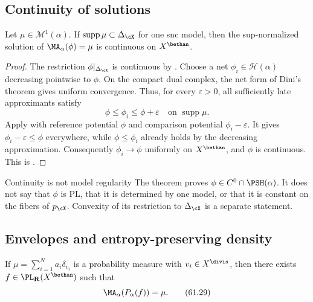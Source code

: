\subsection{Continuity of solutions}
\label{subsec:mpwn-continuous-solutions}

\begin{theorem}\label{thm:mpwn-dual-complex-regularity}
Let $\mu\in\mathcal M^1(\alpha)$.  If
$\operatorname{supp}\mu\subset\Delta_{\cX}$ for one snc model, then the
sup-normalized solution of
$\MA_\alpha(\phi)=\mu$ is continuous on $X^{\bethan}$.
\end{theorem}

\begin{proof}
The restriction $\phi|_{\Delta_{\cX}}$ is continuous by
.  Choose a net
$\phi_i\in\mathcal H(\alpha)$ decreasing pointwise to $\phi$.
On the compact dual complex, the net form of Dini's theorem gives
uniform convergence.  Thus, for every $\varepsilon>0$, all sufficiently
late approximants satisfy
\[
              \phi\leq\phi_i\leq\phi+\varepsilon
       \quad\text{on }\operatorname{supp}\mu.
\]
Apply  with reference potential $\phi$
and comparison potential $\phi_i-\varepsilon$.
It gives $\phi_i-\varepsilon\leq\phi$ everywhere, while
$\phi\leq\phi_i$ already holds by the decreasing approximation.
Consequently $\phi_i\to\phi$ uniformly on $X^{\bethan}$, and
$\phi$ is continuous.  This is \cite[Theorem~8.2.1]{MPWN25}.
\end{proof}

\noindent\begin{minipage}{\linewidth}
\begin{warning}{Continuity is not model regularity}
\label{warn:mpwn-continuous-not-model}
The theorem proves $\phi\in C^0\cap\PSH(\alpha)$.  It does not say that
$\phi$ is PL, that it is determined by one model, or that it is constant
on the fibers of $p_{\cX}$.  Convexity of its restriction to
$\Delta_{\cX}$ is a separate statement.
\end{warning}
\end{minipage}\par

\subsection{Envelopes and entropy-preserving density}
\label{subsec:mpwn-envelope-density}

\begin{corollary}\label{cor:mpwn-divisorial-envelope}
If $\mu=\sum_{i=1}^Na_i\delta_{v_i}$ is a probability measure with
$v_i\in X^{\divis}$, then there exists
$f\in\PL_{\mathbf R}(X^{\bethan})$ such
that
\[
                   \MA_\alpha(P_\alpha(f))=\mu.
\tag{61.29}\label{eq:mpwn-divisorial-envelope-solution}
\]
\end{corollary}

